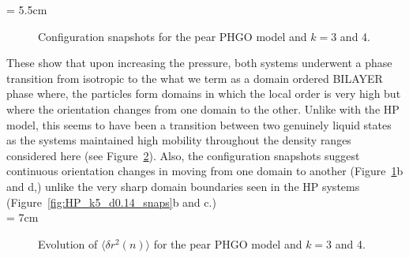 \picW = 5.5cm
\begin{figure}
	\hspace{2cm}
	
	\hspace{2cm}
	\caption{Configuration snapshots for the pear PHGO model and $k=3$ and 4.}
	\label{fig:GBP_snaps_k3k4}
\end{figure}

These show that upon increasing the pressure, both systems underwent a phase transition from
isotropic to the what we term as a domain ordered BILAYER phase where, the particles form 
domains in which 
the local order is very high but where the orientation changes from one domain to the other. 
Unlike with the HP model, this seems to have been a transition between two genuinely
liquid states as the systems maintained high mobility throughout the density ranges considered here
(see Figure~\ref{fig:PHGO_dc_k3k4}). Also, the configuration snapshots suggest continuous
orientation changes in moving from one domain to another (\eg Figure~\ref{fig:GBP_snaps_k3k4}b
and d,) unlike the very sharp domain
boundaries seen in the HP systems (\eg Figure~\ref{fig:HP_k5_d0.14_snaps}b and c.)\\

\picW = 7cm
\begin{figure}
	\centering
	\caption{Evolution of $\langle\delta r^2(n)\rangle$ for the pear PHGO model and $k=3$
	and 4.}
	\label{fig:PHGO_dc_k3k4}
\end{figure}

